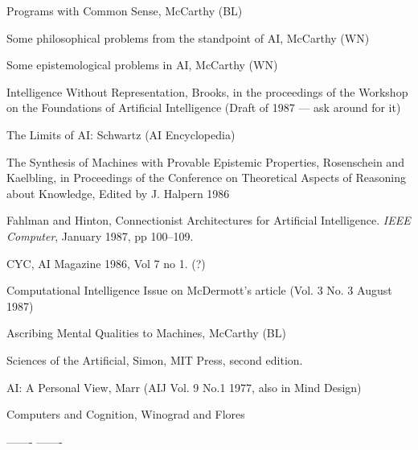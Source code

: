 \begin{required}

   \paper  Programs with Common Sense, McCarthy (BL)

   \paper  Some philosophical problems from the standpoint of AI, McCarthy (WN)

   \paper  Some epistemological problems in AI, McCarthy (WN)

   \paper  Intelligence Without Representation, Brooks, in the proceedings
        of the Workshop on the Foundations of Artificial Intelligence
        (Draft of 1987 --- ask around for it)

   \paper  The Limits of AI: Schwartz (AI Encyclopedia)

   \paper  The Synthesis of Machines with Provable Epistemic Properties,
        Rosenschein and Kaelbling, in Proceedings of the Conference on
        Theoretical Aspects of Reasoning about Knowledge, Edited by J.
        Halpern 1986 

\paper Fahlman and Hinton, Connectionist Architectures for Artificial
Intelligence.  {\em IEEE Computer}, January 1987, pp 100--109.

\paper CYC, AI Magazine 1986, Vol 7 no 1. (?)

\end{required}

\begin{optional}

   \paper  Computational Intelligence Issue on McDermott's article (Vol. 3
        No. 3 August 1987)

   \paper  Ascribing Mental Qualities to Machines, McCarthy (BL)

   \paper  Sciences of the Artificial, Simon, MIT Press, second edition.

   \paper  AI: A Personal View, Marr (AIJ Vol. 9 No.1 1977, also in Mind Design)

   \paper  Computers and Cognition,  Winograd and Flores 

\end{optional}


-------
-------

